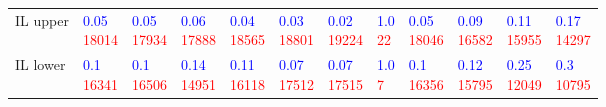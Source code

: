 \begin{tabular}{llllllllllll}
IL upper    &  \makecell{\textcolor{blue}{0.05} \\ \textcolor{red}{18014}} &  \makecell{\textcolor{blue}{0.05} \\ \textcolor{red}{17934}} &  \makecell{\textcolor{blue}{0.06} \\ \textcolor{red}{17888}} &  \makecell{\textcolor{blue}{0.04} \\ \textcolor{red}{18565}} &  \makecell{\textcolor{blue}{0.03} \\ \textcolor{red}{18801}} &  \makecell{\textcolor{blue}{0.02} \\ \textcolor{red}{19224}} &    \makecell{\textcolor{blue}{1.0} \\ \textcolor{red}{22}} &  \makecell{\textcolor{blue}{0.05} \\ \textcolor{red}{18046}} &  \makecell{\textcolor{blue}{0.09} \\ \textcolor{red}{16582}} &  \makecell{\textcolor{blue}{0.11} \\ \textcolor{red}{15955}} &  \makecell{\textcolor{blue}{0.17} \\ \textcolor{red}{14297}} \\
IL lower    &   \makecell{\textcolor{blue}{0.1} \\ \textcolor{red}{16341}} &   \makecell{\textcolor{blue}{0.1} \\ \textcolor{red}{16506}} &  \makecell{\textcolor{blue}{0.14} \\ \textcolor{red}{14951}} &  \makecell{\textcolor{blue}{0.11} \\ \textcolor{red}{16118}} &  \makecell{\textcolor{blue}{0.07} \\ \textcolor{red}{17512}} &  \makecell{\textcolor{blue}{0.07} \\ \textcolor{red}{17515}} &     \makecell{\textcolor{blue}{1.0} \\ \textcolor{red}{7}} &   \makecell{\textcolor{blue}{0.1} \\ \textcolor{red}{16356}} &  \makecell{\textcolor{blue}{0.12} \\ \textcolor{red}{15795}} &  \makecell{\textcolor{blue}{0.25} \\ \textcolor{red}{12049}} &   \makecell{\textcolor{blue}{0.3} \\ \textcolor{red}{10795}} \\

\end{tabular}
